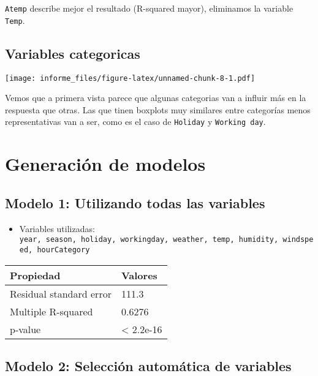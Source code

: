 \documentclass[
]{article}
\providecommand{\tightlist}{%
  \setlength{\itemsep}{0pt}\setlength{\parskip}{0pt}}
\begin{document}
\texttt{Atemp} describe mejor el resultado (R-squared mayor), eliminamos
la variable \texttt{Temp}.

\hypertarget{variables-categoricas}{%
\subsection{Variables categoricas}\label{variables-categoricas}}

\texttt{[image: informe\_files/figure-latex/unnamed-chunk-8-1.pdf]}

Vemos que a primera vista parece que algunas categorias van a influir
más en la respuesta que otras. Las que tinen boxplots muy similares
entre categorías menos representativas van a ser, como es el caso de
\texttt{Holiday} y \texttt{Working\ day}.

\hypertarget{generaciuxf3n-de-modelos}{%
\section{Generación de modelos}\label{generaciuxf3n-de-modelos}}

\hypertarget{modelo-1-utilizando-todas-las-variables}{%
\subsection{Modelo 1: Utilizando todas las
variables}\label{modelo-1-utilizando-todas-las-variables}}

\begin{itemize}
\tightlist
\item
  Variables utilizadas:
  \texttt{year,\ season,\ holiday,\ workingday,\ weather,\ temp,\ humidity,\ windspeed,\ hourCategory}
\end{itemize}

\begin{longtable}[]{@{}ll@{}}
\toprule
Propiedad & Valores\tabularnewline
\midrule
\endhead
Residual standard error & 111.3\tabularnewline
Multiple R-squared & 0.6276\tabularnewline
p-value & \textless{} 2.2e-16\tabularnewline
\bottomrule
\end{longtable}

\hypertarget{modelo-2-selecciuxf3n-automuxe1tica-de-variables}{%
\subsection{Modelo 2: Selección automática de
variables}\label{modelo-2-selecciuxf3n-automuxe1tica-de-variables}}
\end{document}
